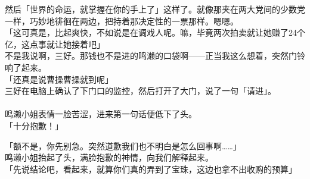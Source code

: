 然后「世界的命运，就掌握在你的手上了」这样了。就像那夹在两大党间的少数党一样，巧妙地徘徊在两边，把持着那决定性的一票那样。嗯嗯。\\

「这可真是，比起爽快，不如说是在调戏人呢。嘛，毕竟两次拍卖就让她赚了24个亿，这点事就让她接着吧」\\

不是我说啊，三好。那钱也不是进的鸣濑的口袋啊——正当我这么想着，突然门铃响了起来。\\

「还真是说曹操曹操就到呢」\\

三好在电脑上确认了下门口的监控，然后打开了大门，说了一句「请进」。\\

\sqsplit\\

鸣濑小姐表情一脸苦涩，进来第一句话便低下了头。\\

「十分抱歉！」

「额不是，你先别急。突然道歉我们也不明白是怎么回事啊……」\\

鸣濑小姐抬起了头，满脸抱歉的神情，向我们解释起来。\\

「先说结论吧，看起来，就算你们真的弄到了宝珠，这边也拿不出收购的预算」\\

